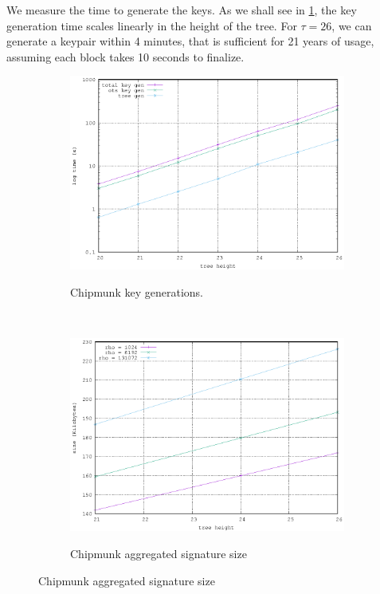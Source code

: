 We measure the time to generate the keys. As we shall see in \ref{fig:keygen}, the key generation time scales linearly in the 
height of the tree. For $\tau = 26$, we can generate a keypair within 4 minutes, that is sufficient for 21 years of usage, assuming 
each block takes 10 seconds to finalize. 
\begin{figure}[H] 
  \centering
  \begin{subfigure}[b]
  {0.45\textwidth}    \centering
  \includegraphics[width=\textwidth]{figures/key_gen.eps}\\
  \caption{Chipmunk key generations.}
  \label{fig:keygen}
  \end{subfigure}
~
\begin{subfigure}[b]{0.45\textwidth}    \centering
  \includegraphics[width=\textwidth]{figures/sig_size.eps}\\
  \caption{Chipmunk aggregated signature size}
  \label{fig:sigize}
  \end{subfigure}

\end{figure}


